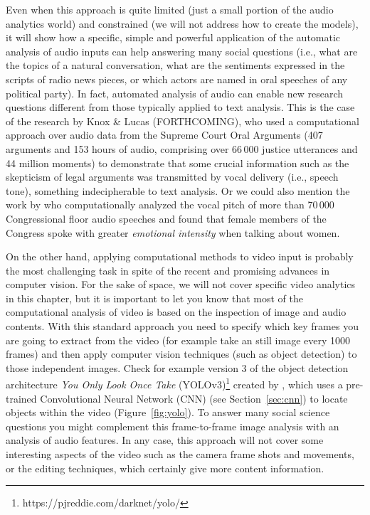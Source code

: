 Even when this approach is quite limited (just a small portion of the audio analytics world) and constrained (we will not address how to create the models), it will show how a specific, simple and powerful application of the automatic analysis of audio inputs can help answering many social questions (i.e., what are the topics of a natural conversation, what are the sentiments expressed in the scripts of radio news pieces, or which actors are named in oral speeches of any political party). In fact, automated analysis of audio can enable new research questions different from those typically applied to text analysis. This is the case of the research by Knox \& Lucas (FORTHCOMING), who used a computational approach over audio data from the Supreme Court Oral Arguments (407 arguments and 153 hours of audio, comprising over 66\,000 justice utterances and 44 million moments) to demonstrate that some crucial information such as the skepticism of legal arguments was transmitted by vocal delivery (i.e., speech tone), something indecipherable to text analysis. Or we could also mention the work by \cite{dietrich2019pitch} who computationally analyzed the vocal pitch of more than 70\,000 Congressional floor audio speeches and found that female members of the Congress spoke with greater \textit{emotional intensity} when talking about women.

On the other hand, applying computational methods to video input is probably the most challenging task in spite of the recent and promising advances in computer vision. For the sake of space, we will not cover specific video analytics in this chapter, but it is important to let you know that most of the computational analysis of video is based on the inspection of image and audio contents. With this standard approach you need to specify which key frames you are going to extract from the video (for example take an still image every 1000 frames) and then apply computer vision techniques (such as object detection) to those independent images. Check for example  version 3 of the object detection architecture \textit{You Only Look Once Take} (YOLOv3)\footnote{https://pjreddie.com/darknet/yolo/} created by \citet{yolov3}, which uses a pre-trained Convolutional Neural Network (CNN) (see Section~\ref{sec:cnn}) to locate objects within the video (Figure~\ref{fig:yolo}). To answer many social science questions you might complement this frame-to-frame image analysis with an analysis of audio features. In any case, this approach will not cover some interesting aspects of the video such as the camera frame shots and movements, or the editing techniques, which certainly give more content information.

